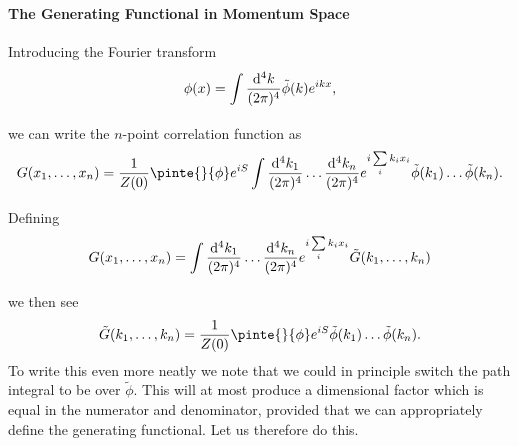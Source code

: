 \paragraph{The Generating Functional in Momentum Space}
Introducing the Fourier transform
\begin{align*}
	\phi(x) = \int\limits_{}^{}\frac{\dd[4]{k}}{(2\pi)^{4}}\tilde{\phi}(k)e^{ikx},
\end{align*}
we can write the $n$-point correlation function as
\begin{align*}
	G(x_{1}, \dots, x_{n}) = \frac{1}{Z(0)}\pinte{}{\phi}e^{iS}\inte{}{}\frac{\dd[4]{k_{1}}}{(2\pi)^{4}}\dots \frac{\dd[4]{k_{n}}}{(2\pi)^{4}}e^{i\sum\limits_{i}k_{i}x_{i}}\tilde{\phi}(k_{1})\dots \tilde{\phi}(k_{n}).
\end{align*}
Defining
\begin{align*}
	G(x_{1}, \dots, x_{n}) = \int\limits_{}^{}\frac{\dd[4]{k_{1}}}{(2\pi)^{4}}\dots \frac{\dd[4]{k_{n}}}{(2\pi)^{4}}e^{i\sum\limits_{i}k_{i}x_{i}}\tilde{G}(k_{1}, \dots, k_{n})
\end{align*}
we then see
\begin{align*}
	\tilde{G}(k_{1}, \dots, k_{n}) = \frac{1}{Z(0)}\pinte{}{\phi}e^{iS}\tilde{\phi}(k_{1})\dots \tilde{\phi}(k_{n}).
\end{align*}
To write this even more neatly we note that we could in principle switch the path integral to be over $\tilde{\phi}$. This will at most produce a dimensional factor which is equal in the numerator and denominator, provided that we can appropriately define the generating functional. Let us therefore do this.

